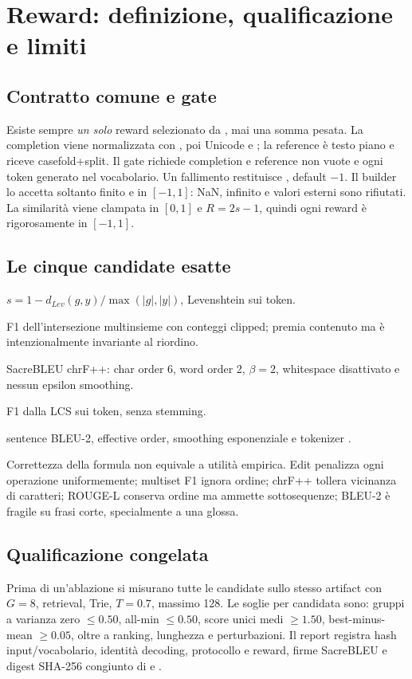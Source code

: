 \chapter{Reward: definizione, qualificazione e limiti}\label{chap:rewards}
\section{Contratto comune e gate}
Esiste sempre \emph{un solo} reward selezionato da , mai una
somma pesata. La completion viene normalizzata con
, poi Unicode  e
; la reference è testo piano e riceve casefold+split. Il gate
richiede completion e reference non vuote e ogni token generato nel vocabolario.
Un fallimento restituisce , default $-1$. Il builder lo
accetta soltanto finito e in $[-1,1]$: NaN, infinito e valori esterni sono
rifiutati. La
similarità viene clampata in $[0,1]$ e $R=2s-1$, quindi ogni reward è
rigorosamente in $[-1,1]$.

\section{Le cinque candidate esatte}
\begin{description}[style=nextline]
\item[edit-validity] $s=1-d_{Lev}(g,y)/\max(|g|,|y|)$, Levenshtein sui token.
\item[token-f1-validity] F1 dell'intersezione multinsieme con conteggi clipped;
premia contenuto ma è intenzionalmente invariante al riordino.
\item[chrfpp-validity] SacreBLEU chrF++: char order 6, word order 2, $\beta=2$,
whitespace disattivato e nessun epsilon smoothing.
\item[rouge-l-validity] F1 dalla LCS sui token, senza stemming.
\item[sbleu2-exp-validity] sentence BLEU-2, effective order, smoothing
esponenziale e tokenizer  \cite{post2018sacrebleu}.
\end{description}
Correttezza della formula non equivale a utilità empirica. Edit penalizza ogni
operazione uniformemente; multiset F1 ignora ordine; chrF++ tollera vicinanza di
caratteri; ROUGE-L conserva ordine ma ammette sottosequenze; BLEU-2 è fragile su
frasi corte, specialmente a una glossa.

\section{Qualificazione congelata}
Prima di un'ablazione si misurano tutte le candidate sullo stesso artifact con
$G=8$, retrieval, Trie, $T=0.7$, massimo 128. Le soglie per candidata sono:
gruppi a varianza zero $\le0.50$, all-min $\le0.50$, score unici medi $\ge1.50$,
best-minus-mean $\ge0.05$, oltre a ranking, lunghezza e perturbazioni. Il report
registra hash input/vocabolario, identità decoding, protocollo e reward, firme
SacreBLEU e digest SHA-256 congiunto di  e
.


